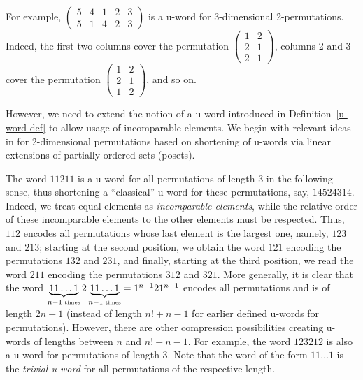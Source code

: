 \documentclass[12pt]{article}
\begin{document}
For example, {\footnotesize $\left(\begin{array}{ccccc} 5 & 4 & 1 & 2 & 3 \\ 5 & 1 & 4 & 2 & 3 \end{array}\right)$} is a u-word for 3-dimensional 2-permutations. Indeed, the first two columns cover the permutation  {\footnotesize $\left(\begin{array}{cc} 1 & 2 \\ 2 & 1 \\ 2 & 1 \end{array}\right)$}, columns 2 and 3 cover the permutation  {\footnotesize $\left(\begin{array}{cc} 1 & 2 \\ 2 & 1 \\ 1 & 2 \end{array}\right)$}, and so on.

However, we need to extend the notion of a u-word introduced in Definition~\ref{u-word-def} to allow usage of incomparable elements. We begin with relevant ideas in \cite{KPV} for 2-dimensional permutations based on shortening of u-words via linear extensions of partially ordered sets (posets).

The word $11211$ is a u-word for all permutations of length 3 in the following sense, thus shortening a ``classical'' u-word for these permutations, say, $14524314$. Indeed, we treat equal elements as {\em incomparable elements}, while the relative order of these incomparable elements to the other elements must be respected. Thus, $112$ encodes all permutations whose last element is the largest one, namely, $123$ and $213$; starting at the second position, we obtain the word $121$ encoding the permutations $132$ and $231$, and finally, starting at the third position, we read the word $211$ encoding the permutations $312$ and $321$.   More generally, it is clear that the word 
$\underbrace{11\ldots 1}_{n-1\mbox{\tiny\ times}}2\underbrace{11\ldots 1}_{n-1\mbox{\tiny\ times}}=1^{n-1}21^{n-1}$ encodes all permutations and is of length $2n-1$ (instead of length $n!+n-1$ for earlier defined u-words for permutations). However, there are other compression possibilities creating u-words of lengths between $n$ and $n!+n-1$.  For example, the word $123212$ is also a u-word for permutations of length $3$. Note that the word of the form $11\ldots 1$ is the {\em trivial u-word} for all permutations of the respective length. 
\end{document}
